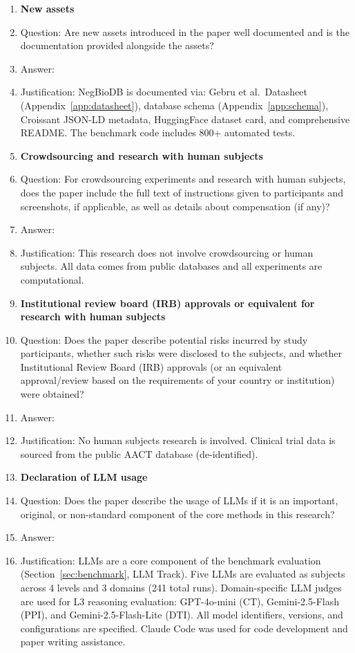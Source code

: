\begin{enumerate}
\item {\bf New assets}
    \item[] Question: Are new assets introduced in the paper well documented and is the documentation provided alongside the assets?
    \item[] Answer: \answerYes{}
    \item[] Justification: NegBioDB is documented via: Gebru et al.\ Datasheet (Appendix~\ref{app:datasheet}), database schema (Appendix~\ref{app:schema}), Croissant JSON-LD metadata, HuggingFace dataset card, and comprehensive README. The benchmark code includes 800+ automated tests.

\item {\bf Crowdsourcing and research with human subjects}
    \item[] Question: For crowdsourcing experiments and research with human subjects, does the paper include the full text of instructions given to participants and screenshots, if applicable, as well as details about compensation (if any)?
    \item[] Answer: \answerNA{}
    \item[] Justification: This research does not involve crowdsourcing or human subjects. All data comes from public databases and all experiments are computational.

\item {\bf Institutional review board (IRB) approvals or equivalent for research with human subjects}
    \item[] Question: Does the paper describe potential risks incurred by study participants, whether such risks were disclosed to the subjects, and whether Institutional Review Board (IRB) approvals (or an equivalent approval/review based on the requirements of your country or institution) were obtained?
    \item[] Answer: \answerNA{}
    \item[] Justification: No human subjects research is involved. Clinical trial data is sourced from the public AACT database (de-identified).

\item {\bf Declaration of LLM usage}
    \item[] Question: Does the paper describe the usage of LLMs if it is an important, original, or non-standard component of the core methods in this research?
    \item[] Answer: \answerYes{}
    \item[] Justification: LLMs are a core component of the benchmark evaluation (Section~\ref{sec:benchmark}, LLM Track). Five LLMs are evaluated as subjects across 4 levels and 3 domains (241 total runs). Domain-specific LLM judges are used for L3 reasoning evaluation: GPT-4o-mini (CT), Gemini-2.5-Flash (PPI), and Gemini-2.5-Flash-Lite (DTI). All model identifiers, versions, and configurations are specified. Claude Code was used for code development and paper writing assistance.

\end{enumerate}
